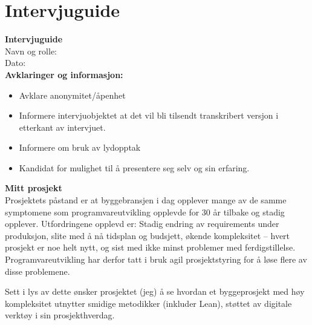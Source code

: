 \section{Intervjuguide} \label{apx:interview_guide}
\noindent\textbf{Intervjuguide} \\
Navn og rolle: \\
Dato: \\

\noindent\textbf{Avklaringer og informasjon:} 
\begin{itemize}
    \item Avklare anonymitet/åpenhet
    \item Informere intervjuobjektet at det vil bli tilsendt transkribert versjon i etterkant av intervjuet.
    \item Informere om bruk av lydopptak
    \item Kandidat for mulighet til å presentere seg selv og sin erfaring.
\end{itemize}

\noindent\textbf{Mitt prosjekt} \\
Prosjektets påstand er at byggebransjen i dag opplever mange av de samme symptomene som programvareutvikling opplevde for 30 år tilbake og stadig opplever. Utfordringene opplevd er: Stadig endring av requirements under produksjon, slite med å nå tidsplan og budsjett, økende kompleksitet – hvert prosjekt er noe helt nytt, og sist med ikke minst problemer med ferdigstillelse. Programvareutvikling har derfor tatt i bruk agil prosjektstyring for å løse flere av disse problemene.

Sett i lys av dette ønsker prosjektet (jeg) å se hvordan et byggeprosjekt med høy kompleksitet utnytter smidige metodikker (inkluder Lean), støttet av digitale verktøy i sin prosjekthverdag. \\

